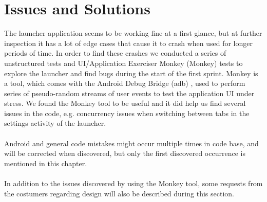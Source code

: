 
\chapter{Issues and Solutions}

The launcher application seems to be working fine at a first glance, but at further inspection it has a lot of edge cases that cause it to crash when used for longer periods of time. In order to find these crashes we conducted a series of unstructured tests and UI/Application Exerciser Monkey (Monkey) \parencite{android_monkey} tests to explore the launcher and find bugs during the start of the first sprint. Monkey is a tool, which comes with the Android Debug Bridge (adb) \parencite{android_adb}, used to perform series of pseudo-random streams of user events to test the application UI under stress. We found the Monkey tool to be useful and it did help us find several issues in the code, e.g. concurrency issues when switching between tabs in the settings activity of the launcher.
\\\\
Android and general code mistakes might occur multiple times in code base, and will be corrected when discovered, but only the first discovered occurrence is mentioned in this chapter. 
\\\\
In addition to the issues discovered by using the Monkey tool, some requests from the costumers regarding design will also be described during this section.





















